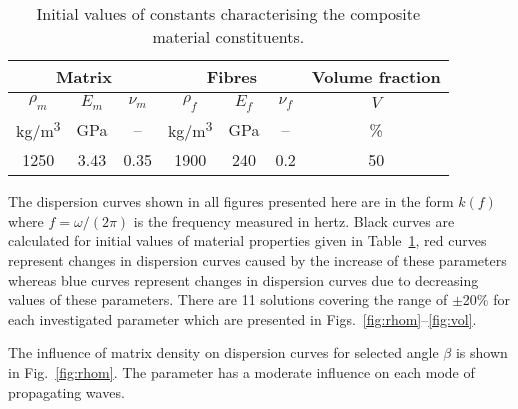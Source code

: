 \documentclass[preprint,12pt]{elsarticle}
\begin{document}
 \begin{table}[h]
 	\renewcommand{\arraystretch}{1.3}
 	\centering \footnotesize
 	\caption{Initial values of constants characterising the composite material 
 	constituents.}
 	\begin{tabular}{ccccccc} 
 		\toprule
 		\multicolumn{3}{c}{\textbf{Matrix} }	& \multicolumn{3}{c}{\textbf{Fibres} } & 
 		\textbf{Volume fraction}	 
\\ 
 		\midrule
 		\(\rho_m\) & \(E_m\) & \(\nu_m\)  & \(\rho_f\) & \(E_f\) & \(\nu_f\) & \(V\)\\
 		kg/m\textsuperscript{3} &GPa& --  & kg/m\textsuperscript{3}  & GPa& -- & \%\\ 
 		\cmidrule(lr){1-3} \cmidrule(lr){4-6} \cmidrule(lr){7-7}
 		1250 &3.43& 0.35& 1900 & 240 & 0.2 & 50\\
 		\bottomrule 
 	\end{tabular} 
 	\label{tab:matprop}
 \end{table}
 
 The dispersion curves shown in all figures presented here are in the form \(k(f)\) where 
 \(f=\omega/(2 \pi)\) is the frequency measured in hertz. Black curves are calculated for 
 initial values of material properties given in Table~\ref{tab:matprop}, red curves 
 represent changes in dispersion curves caused by the increase of these parameters 
 whereas blue curves represent changes in dispersion curves due to decreasing values 
 of these parameters. There are 11 solutions covering the range of \(\pm\)20\% for each 
 investigated parameter which are presented in Figs.~\ref{fig:rhom}--\ref{fig:vol}.
 
 The influence of matrix density on dispersion curves for selected angle \(\beta\) is 
 shown in Fig.~\ref{fig:rhom}. The parameter has a moderate influence on each mode of 
 propagating waves.
 
\end{document}
